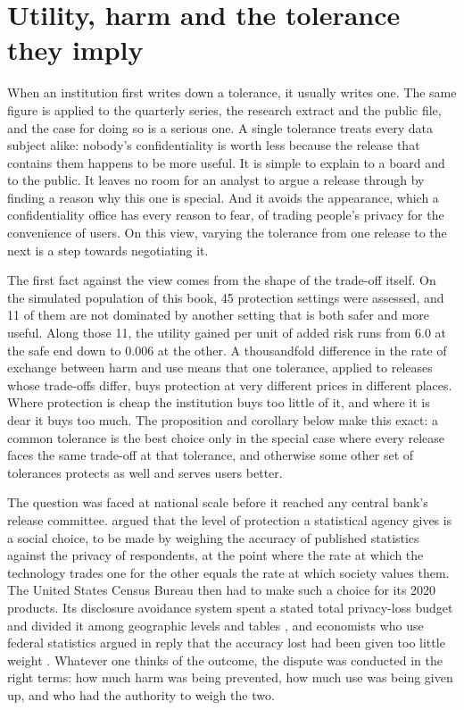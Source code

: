 \chapter{Utility, harm and the tolerance they imply}\label{ch:tolerance}

When an institution first writes down a tolerance, it usually writes one. The same
figure is applied to the quarterly series, the research extract and the public
file, and the case for doing so is a serious one. A single tolerance treats every
data subject alike: nobody's confidentiality is worth less because the release that
contains them happens to be more useful. It is simple to explain to a board and to
the public. It leaves no room for an analyst to argue a release through by finding
a reason why this one is special. And it avoids the appearance, which a
confidentiality office has every reason to fear, of trading people's privacy for
the convenience of users. On this view, varying the tolerance from one release to
the next is a step towards negotiating it.

The first fact against the view comes from the shape of the trade-off itself. On
the simulated population of this book, 45 protection settings were assessed, and 11
of them are not dominated by another setting that is both safer and more useful.
Along those 11, the utility gained per unit of added risk runs from 6.0 at the safe
end down to 0.006 at the other.
A thousandfold difference in the rate of exchange between harm and use means that
one tolerance, applied to releases whose trade-offs differ, buys protection at very
different prices in different places. Where protection is cheap the institution
buys too little of it, and where it is dear it buys too much. The proposition and
corollary below make this exact: a common tolerance is the best choice only in the
special case where every release faces the same trade-off at that tolerance, and
otherwise some other set of tolerances protects as well and serves users better.

The question was faced at national scale before it reached any central bank's
release committee. \citet{abowd2019} argued that the level of protection a
statistical agency gives is a social choice, to be made by weighing the accuracy
of published statistics against the privacy of respondents, at the point where the
rate at which the technology trades one for the other equals the rate at which
society values them. The United States Census Bureau then had to make such a choice
for its 2020 products. Its disclosure avoidance system spent a stated total
privacy-loss budget and divided it among geographic levels and tables
\citep{abowd2022}, and economists who use federal statistics argued in reply that
the accuracy lost had been given too little weight \citep{hotz2022}. Whatever one
thinks of the outcome, the dispute was conducted in the right terms: how much harm
was being prevented, how much use was being given up, and who had the authority to
weigh the two.

